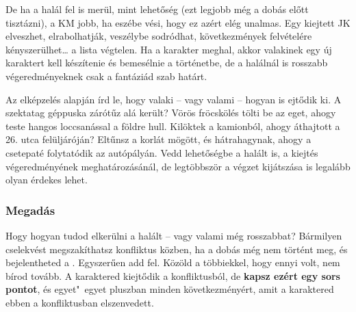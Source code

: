 De ha a halál fel is merül, mint lehetőség (ezt legjobb még a dobás előtt tisztázni), a KM jobb, ha eszébe vési, hogy ez azért elég unalmas. Egy kiejtett JK elveszhet, elrabolhatják, veszélybe sodródhat, következmények felvételére kényszerülhet… a lista végtelen. Ha a karakter meghal, akkor valakinek egy új karaktert kell készítenie és bemesélnie a történetbe, de a halálnál is rosszabb végeredményeknek csak a fantáziád szab határt.

Az elképzelés alapján írd le, hogy valaki – vagy valami – hogyan is ejtődik ki. A szektatag géppuska zárótűz alá került? Vörös fröcskölés tölti be az eget, ahogy teste hangos loccsanással a földre hull. Kilöktek a kamionból, ahogy áthajtott a 26. utca felüljáróján? Eltűnsz a korlát mögött, és hátrahagynak, ahogy a csetepaté folytatódik az autópályán. Vedd lehetőségbe a halált is, a kiejtés végeredményének meghatározásánál, de legtöbbször a végzet kijátszása is legalább olyan érdekes lehet.

\newpage


\subsubsection{Megadás}

Hogy hogyan tudod elkerülni a halált – vagy valami még rosszabbat? Bármilyen cselekvést megszakíthatsz konfliktus közben, ha a dobás még nem történt meg, és bejelentheted a . Egyszerűen add fel. Közöld a többiekkel, hogy ennyi volt, nem bírod tovább. A karaktered kiejtődik a konfliktusból, de \textbf{kapsz ezért egy sors pontot}, és egyet"~egyet pluszban minden következményért, amit a karaktered ebben a konfliktusban elszenvedett.

